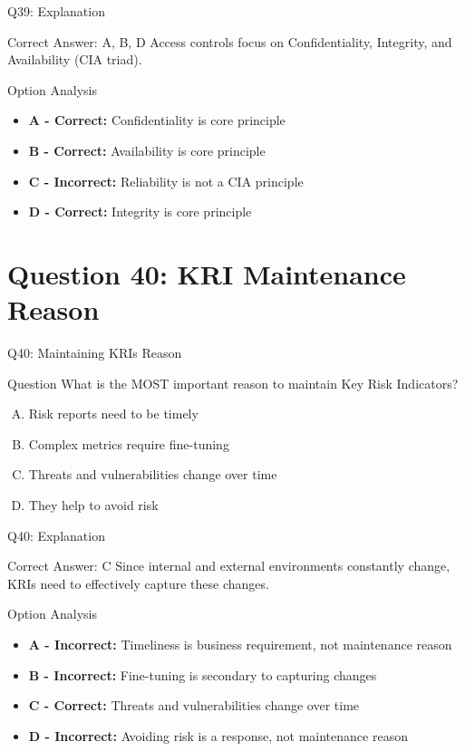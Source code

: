 \documentclass{beamer}
\begin{document}
	\begin{frame}{Q39: Explanation}
		\begin{block}{Correct Answer: A, B, D}
			Access controls focus on Confidentiality, Integrity, and Availability (CIA triad).
		\end{block}
		\begin{block}{Option Analysis}
			\begin{itemize}
				\item \textbf{A - Correct:} Confidentiality is core principle
				\item \textbf{B - Correct:} Availability is core principle
				\item \textbf{C - Incorrect:} Reliability is not a CIA principle
				\item \textbf{D - Correct:} Integrity is core principle
			\end{itemize}
		\end{block}
	\end{frame}
	
	\section{Question 40: KRI Maintenance Reason}
	
	\begin{frame}{Q40: Maintaining KRIs Reason}
		\begin{block}{Question}
			What is the MOST important reason to maintain Key Risk Indicators?
		\end{block}
		\begin{enumerate}[(A)]
			\item Risk reports need to be timely
			\item Complex metrics require fine-tuning
			\item Threats and vulnerabilities change over time
			\item They help to avoid risk
		\end{enumerate}
	\end{frame}
	
	\begin{frame}{Q40: Explanation}
		\begin{block}{Correct Answer: C}
			Since internal and external environments constantly change, KRIs need to effectively capture these changes.
		\end{block}
		\begin{block}{Option Analysis}
			\begin{itemize}
				\item \textbf{A - Incorrect:} Timeliness is business requirement, not maintenance reason
				\item \textbf{B - Incorrect:} Fine-tuning is secondary to capturing changes
				\item \textbf{C - Correct:} Threats and vulnerabilities change over time
				\item \textbf{D - Incorrect:} Avoiding risk is a response, not maintenance reason
			\end{itemize}
		\end{block}
	\end{frame}
	
\end{document}
